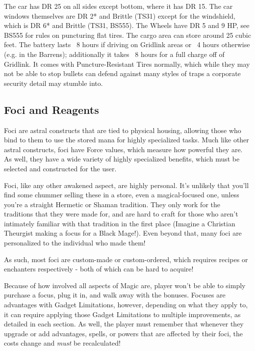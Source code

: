 The car has DR 25 on all sides except bottom, where it has DR 15. The car windows themselves are DR 2* and Brittle (TS31) except for the windshield, which is DR 6* and Brittle (TS31, BS555). The Wheels have DR 5 and 9 HP, see BS555 for rules on puncturing flat tires. The cargo area can store around 25 cubic feet. The battery lasts ~8 hours if driving on Gridlink areas or ~4 hours otherwise (e.g. in the Barrens); additionally it takes ~8 hours for a full charge off of Gridlink. It comes with Puncture-Resistant Tires normally, which while they may not be able to stop bullets can defend against many styles of traps a corporate security detail may stumble into.

	
\begin{multicols*}{2}	

	\subsection{Foci and Reagents}
	
	Foci are astral constructs that are tied to physical housing, allowing those who bind to them to use the stored mana for highly specialized tasks. Much like other astral constructs, foci have Force values, which measure how powerful they are. As well, they have a wide variety of highly specialized benefits, which must be selected and constructed for the user.
	
	Foci, like any other awakened aspect, are highly personal. It's unlikely that you'll find some chummer selling these in a store, even a magical-focused one, unless you're a straight Hermetic or Shaman tradition. They only work for the traditions that they were made for, and are hard to craft for those who aren't intimately familiar with that tradition in the first place (Imagine a Christian Theurgist making a focus for a Black Mage!). Even beyond that, many foci are personalized to the individual who made them!
	
	As such, most foci are custom-made or custom-ordered, which requires recipes or enchanters respectively - both of which can be hard to acquire!
	
	Because of how involved all aspects of Magic are, player won't be able to simply purchase a focus, plug it in, and walk away with the bonuses. Focuses are advantages with Gadget Limitations, however, depending on what they apply to, it can require applying those Gadget Limitations to multiple improvements, as detailed in each section. As well, the player must remember that whenever they upgrade or add advantages, spells, or powers that are affected by their foci, the costs change and \textit{must} be recalculated!
	

\end{multicols*}
